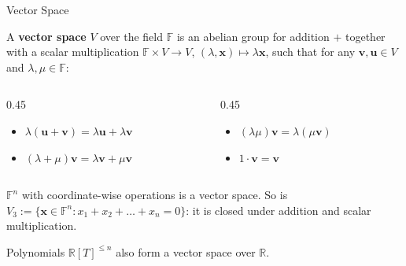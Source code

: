 \documentclass{zkdl-presentation-template}
\begin{document}
    \begin{frame}{Vector Space}
        \begin{definition}
            A \textbf{vector space} $V$ over the field $\mathbb{F}$ is an abelian group for addition $+$ together with a scalar multiplication $\mathbb{F} \times V \to V$, $(\lambda,\mathbf{x}) \mapsto \lambda \mathbf{x}$, such that for any $\mathbf{v},\mathbf{u} \in V$ and $\lambda,\mu \in \mathbb{F}$:
            \begin{columns}
                \begin{column}{0.45\textwidth}
                    \begin{itemize}
                        \item $\lambda(\mathbf{u}+\mathbf{v}) = \lambda \mathbf{u} + \lambda \mathbf{v}$
                        \item $(\lambda + \mu)\mathbf{v} = \lambda \mathbf{v} + \mu \mathbf{v}$
                    \end{itemize}
                \end{column}
                \begin{column}{0.45\textwidth}
                    \begin{itemize}
                        \item $(\lambda \mu)\mathbf{v} = \lambda(\mu \mathbf{v})$
                        \item $1\cdot \mathbf{v} = \mathbf{v}$
                    \end{itemize}
                \end{column}
            \end{columns}
        \end{definition}
        \pause

        \begin{example}
            $\mathbb{F}^n$ with coordinate-wise operations is a vector space. So is $V_3 := \{\mathbf{x} \in \mathbb{F}^n: x_1+x_2+\dots+x_n = 0\}$: it is closed under addition and scalar multiplication.
        \end{example}
        \pause

        \begin{remark}
            Polynomials $\mathbb{R}[T]^{\leq n}$ also form a vector space over $\mathbb{R}$.
        \end{remark}
    \end{frame}
\end{document}
